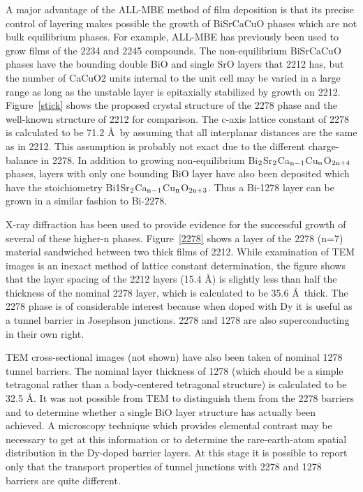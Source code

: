 A major advantage of the ALL-MBE method of film deposition is that its
precise control of layering makes possible the growth of BiSrCaCuO
phases which are not bulk equilibrium phases.  For example, ALL-MBE
has previously been used to grow films of the 2234 and 2245
compounds.\cite{schlom} The non-equilibrium BiSrCaCuO phases have the
bounding double BiO and single SrO layers that 2212 has, but the
number of CaCuO2 units internal to the unit cell may be varied in a
large range as long as the unstable layer is epitaxially stabilized by
growth on 2212.\cite{bozovic2} Figure~\ref{stick} shows the proposed
crystal structure of the 2278 phase and the well-known structure of
2212 for comparison.  The c-axis lattice constant of 2278 is
calculated to be 71.2 \AA\ by assuming that all interplanar distances
are the same as in 2212.  This assumption is probably not exact due to
the different charge-balance in 2278.  In addition to growing
non-equilibrium Bi$\rm _2$Sr$\rm _2$Ca$\rm _{n-1}$Cu$\rm _n$O$\rm
_{2n+4}$ phases, layers with only one bounding BiO layer have also
been deposited which have the stoichiometry Bi1Sr$\rm _2$Ca$\rm
_{n-1}$Cu$\rm _n$O$\rm _{2n+3}$.\cite{bozovic2} Thus a Bi-1278 layer
can be grown in a similar fashion to Bi-2278.

X-ray diffraction has been used to provide evidence for the successful
growth of several of these higher-n phases.\cite{schlom} Figure~\ref{2278}
shows a layer of the 2278 (n=7) material sandwiched between two thick
films of 2212.  While examination of TEM images is an inexact method
of lattice constant determination, the figure shows that the layer
spacing of the 2212 layers (15.4 \AA) is slightly less than half the
thickness of the nominal 2278 layer, which is calculated to be 35.6
\AA\ thick.  The 2278 phase is of considerable interest because when
doped with Dy it is useful as a tunnel barrier in Josephson
junctions.\cite{eckstein} 2278 and 1278 are also superconducting in their own
right.\cite{bozovic2,bozovic3}

TEM cross-sectional images (not shown) have also been taken of nominal
1278 tunnel barriers.  The nominal layer thickness of 1278 (which
should be a simple tetragonal rather than a body-centered tetragonal
structure) is calculated to be 32.5 \AA.  It was not possible from TEM
to distinguish them from the 2278 barriers and to determine whether a
single BiO layer structure has actually been achieved.  A microscopy
technique which provides elemental contrast\cite{pennycook} may be
necessary to get at this information or to determine the
rare-earth-atom spatial distribution in the Dy-doped barrier layers.
At this stage it is possible to report only that the transport
properties of tunnel junctions with 2278 and 1278 barriers are quite
different.\cite{bozovic2}


